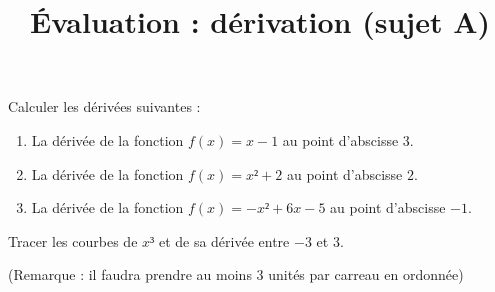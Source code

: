 \documentclass[
	classe=$1^{ere}STI2D$,
]{évaluation}
\begin{document}
\title{Évaluation : dérivation (sujet A)}
\maketitle

\begin{exercice}
	Calculer les dérivées suivantes :
	\begin{enumerate}
		\item La dérivée de la fonction $f(x) = x - 1$ au point d'abscisse $3$.
		\item La dérivée de la fonction $f(x) = x² + 2$ au point d'abscisse $2$.
		\item La dérivée de la fonction $f(x) = -x² + 6x - 5$ au point d'abscisse $-1$.
	\end{enumerate}
\end{exercice}

\begin{exercice}
	Tracer les courbes de $x³$ et de sa dérivée entre $-3$ et $3$.

	(Remarque : il faudra prendre au moins $3$ unités par carreau en ordonnée)

\end{exercice}
\end{document}
